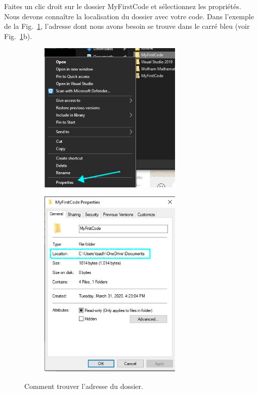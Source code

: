 \documentclass{article}
\newcommand\subfig[2]{{Fig.~\ref{#1}{#2}}}
\newcommand\fig[1]{{Fig.~\ref{#1}}}
\begin{document}
Faites un clic droit sur le dossier MyFirstCode et sélectionnez les propriétés. Nous devons connaître la localisation du dossier avec votre code. Dans l'exemple de la \fig{F:FindFolderAddress}, l'adresse dont nous avons besoin se trouve dans le carré bleu (voir \subfig{F:FindFolderAddress}{b}).
\begin{figure}[H]
\begin{subfigure}[c]{0.5\textwidth}
\includegraphics[width=0.75\textwidth]{Plots/FirstCode_3Properties.jpg}
\end{subfigure}
\begin{subfigure}[c]{0.5\textwidth}
\includegraphics[width=0.75\textwidth]{Plots/FirstCode_4Path.jpg}
\end{subfigure}
\caption{Comment trouver l'adresse du dossier.\label{F:FindFolderAddress}}
\end{figure}
\end{document}
